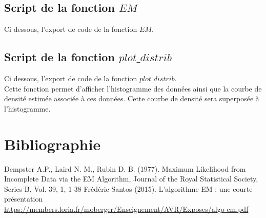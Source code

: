 \documentclass[a4paper,french,10pt]{article}
\begin{document}
\newpage

\subsection{Script de la fonction $EM$}
Ci dessous, l'export de code de la fonction $EM$.


\newpage

\subsection{Script de la fonction $plot\_distrib$}
Ci dessous, l'export de code de la fonction $plot\_distrib$. \\
Cette fonction permet d'afficher l'histogramme des données ainsi que la courbe de densité estimée associée à ces données. Cette courbe de densité sera superposée à l'histogramme.


\newpage

\section{Bibliographie}

\renewcommand\refname{}
\begin{thebibliography}{9}
	Dempster A.P., Laird N. M., Rubin D. B. (1977). Maximum Likelihood from Incomplete Data via the EM Algorithm, Journal of the Royal Statistical Society, Series B, Vol. 39, 1, 1-38
	Frédéric Santos (2015). L'algorithme EM : une courte présentation
	\url{https://members.loria.fr/moberger/Enseignement/AVR/Exposes/algo-em.pdf}
\end{thebibliography}
\end{document}
